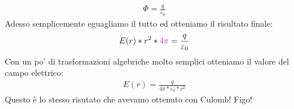                     \begin{align*}
                        \Phi = \frac{q}{\varepsilon_0}
                    \end{align*}
                    Adesso semplicemente eguagliamo il tutto ed otteniamo il risultato finale:
                    \begin{align*}
                        E(r)*r^2*\textcolor{Purple}{4\pi} = \frac{q}{\varepsilon_0}
                    \end{align*}
                    Con un po' di trasformazioni algebriche molto semplici otteniamo il valore del campo elettrico:
                    \begin{align*}
                        E(r)= \frac{q}{4\pi*\varepsilon_0*r^2}
                    \end{align*}
                    Questo è lo stesso risutato che avevamo ottenuto con Culomb! Figo!

